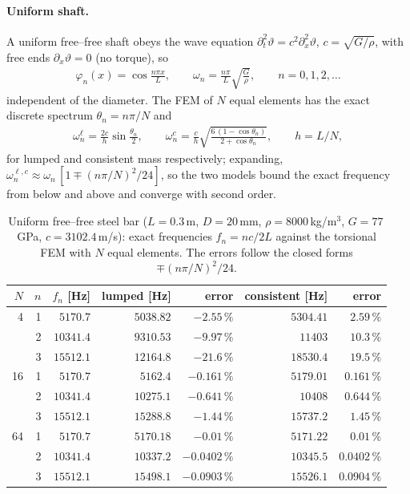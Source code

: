 \documentclass[10pt,a4paper]{article}
\numberwithin{equation}{section}
\begin{document}
\paragraph{Uniform shaft.} A uniform free--free shaft obeys the wave equation $\partial_t^2\vartheta = c^2\partial_x^2\vartheta$, $c = \sqrt{G/\rho}$, with free ends $\partial_x\vartheta = 0$ (no torque), so
\begin{gather}
\varphi_n(x) = \cos\frac{n\pi x}{L},\qquad \omega_n = \frac{n\pi}{L}\sqrt{\frac{G}{\rho}},\qquad n = 0, 1, 2,\dots
\end{gather}
independent of the diameter. The FEM of $N$ equal elements has the exact discrete spectrum $\theta_n = n\pi/N$ and
\begin{gather}
\omega_n^{\ell} = \frac{2c}{h}\sin\frac{\theta_n}{2},\qquad \omega_n^{c} = \frac{c}{h}\sqrt{\frac{6\,(1 - \cos\theta_n)}{2 + \cos\theta_n}},\qquad h = L/N,
\end{gather}
for lumped and consistent mass respectively; expanding, $\omega_n^{\ell,c}\approx\omega_n\,[1\mp(n\pi/N)^2/24]$, so the two models bound the exact frequency from below and above and converge with second order.
\begin{table}[H]\centering\small
\caption{Uniform free--free steel bar ($L = 0.3$\,m, $D = 20$\,mm, $\rho = 8000$\,kg/m$^3$, $G = 77$\,GPa, $c = 3102.4$\,m/s): exact frequencies $f_n = nc/2L$ against the torsional FEM with $N$ equal elements. The errors follow the closed forms $\mp(n\pi/N)^2/24$.}\label{tab:bar}
\begin{tabular}{rrrrrrr}\toprule
$N$ & $n$ & $f_n$ [Hz] & lumped [Hz] & error & consistent [Hz] & error \\ \midrule
4 & 1 & $5170.7$ & $5038.82$ & $-2.55\,\%$ & $5304.41$ & $2.59\,\%$ \\
 & 2 & $10341.4$ & $9310.53$ & $-9.97\,\%$ & $11403$ & $10.3\,\%$ \\
 & 3 & $15512.1$ & $12164.8$ & $-21.6\,\%$ & $18530.4$ & $19.5\,\%$ \\
\midrule
16 & 1 & $5170.7$ & $5162.4$ & $-0.161\,\%$ & $5179.01$ & $0.161\,\%$ \\
 & 2 & $10341.4$ & $10275.1$ & $-0.641\,\%$ & $10408$ & $0.644\,\%$ \\
 & 3 & $15512.1$ & $15288.8$ & $-1.44\,\%$ & $15737.2$ & $1.45\,\%$ \\
\midrule
64 & 1 & $5170.7$ & $5170.18$ & $-0.01\,\%$ & $5171.22$ & $0.01\,\%$ \\
 & 2 & $10341.4$ & $10337.2$ & $-0.0402\,\%$ & $10345.5$ & $0.0402\,\%$ \\
 & 3 & $15512.1$ & $15498.1$ & $-0.0903\,\%$ & $15526.1$ & $0.0904\,\%$ \\

\bottomrule\end{tabular}\end{table}
\end{document}
